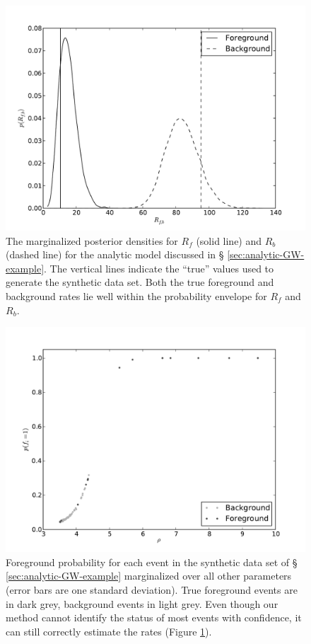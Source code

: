 \documentclass[aps,prd]{revtex4-1}
\begin{document}
\begin{figure}
  \includegraphics[width=\columnwidth]{rates}
  \caption{\label{fig:analytic-rate-recovery} The marginalized
    posterior densities for $R_f$ (solid line) and $R_b$ (dashed line)
    for the analytic model discussed in \S
    \ref{sec:analytic-GW-example}.  The vertical lines indicate the
    ``true'' values used to generate the synthetic data set.  Both the
    true foreground and background rates lie well within the
    probability envelope for $R_f$ and $R_b$.}
\end{figure}

\begin{figure}
  \includegraphics[width=\columnwidth]{pfore}
  \caption{\label{fig:analytic-rate-foreground-probs} Foreground
    probability for each event in the synthetic data set of \S
    \ref{sec:analytic-GW-example} marginalized over all other
    parameters (error bars are one standard deviation).  True
    foreground events are in dark grey, background events in light
    grey.  Even though our method cannot identify the status of most
    events with confidence, it can still correctly estimate the rates
    (Figure \ref{fig:analytic-rate-recovery}).}
\end{figure}
\end{document}
